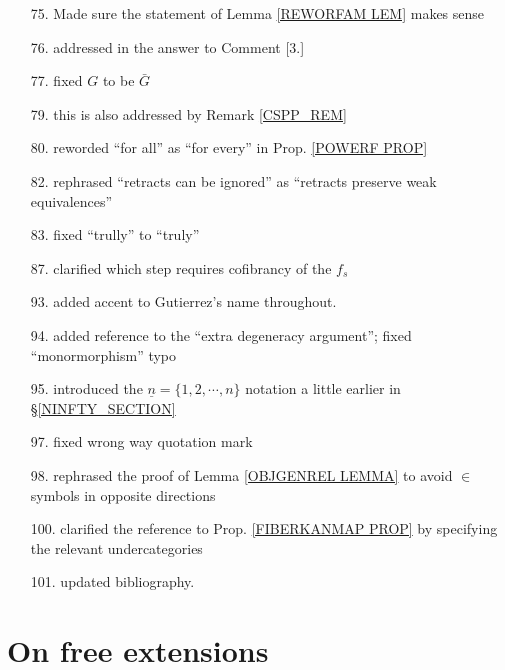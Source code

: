 \documentclass{article}
\begin{document}
\begin{itemize}
\item[75.] Made sure the statement of Lemma \ref{REWORFAM LEM} makes sense

\item[76.] addressed in the answer to Comment [3.]

\item[77.] fixed $G$ to be $\bar{G}$
      
\item[79.] this is also addressed by Remark \ref{CSPP_REM}      
      
\item[80.] reworded ``for all'' as ``for every'' in Prop. \ref{POWERF PROP}

\item[82.] rephrased ``retracts can be ignored''
as ``retracts preserve weak equivalences''

\item[83.] fixed ``trully'' to ``truly''

\item[87.] clarified which step requires cofibrancy of the 
$f_s$

\item[93.] added accent to Gutierrez's name throughout.

\item[94.] added \cite{Ri14} reference to the ``extra degeneracy argument''; fixed ``monormorphism'' typo

\item[95.] introduced the 
$\underline{n} = \{1,2,\cdots,n\}$
notation a little earlier in \S \ref{NINFTY_SECTION}

\item[97.] fixed wrong way quotation mark

\item[98.] rephrased the proof of Lemma \ref{OBJGENREL LEMMA}
to avoid $\in$ symbols in opposite directions

\item[100.] clarified the reference to Prop. \ref{FIBERKANMAP PROP} by specifying the relevant undercategories

\item[101.] updated bibliography.

\end{itemize}


\iffalse

\section{On free extensions}
\end{document}
